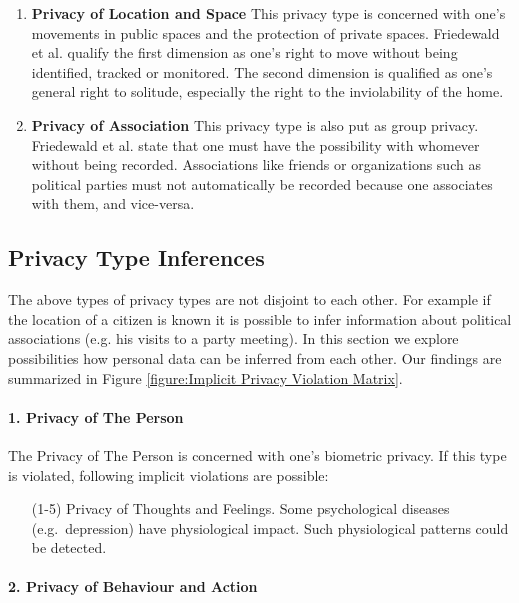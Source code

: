 \begin{enumerate}
\item \textbf{Privacy of Location and Space}
This privacy type is concerned with one's movements in public spaces and the protection of private spaces.
Friedewald et al. qualify the first dimension as one's right to move without being identified, tracked or monitored.
The second dimension is qualified as one's general right to solitude, especially the right to the inviolability of the home.


\item \textbf{Privacy of Association}
This privacy type is also put as group privacy.
Friedewald et al. state that one must have the possibility with whomever without being recorded.
Associations like friends or organizations such as political parties must not automatically be recorded because one associates with them, and vice-versa.
\end{enumerate}

\subsection{Privacy Type Inferences}

The above types of privacy types are not disjoint to each other.
For example if the location of a citizen is known it is possible to infer information about political associations (e.g. his visits to a party meeting).
In this section we explore possibilities how personal data can be inferred from each other.
Our findings are summarized in Figure \ref{figure:Implicit Privacy Violation Matrix}.



\paragraph*{1. Privacy of The Person}

The Privacy of The Person is concerned with one's biometric privacy.
If this type is violated, following implicit violations are possible:

\begin{itemize}
\item [(1-5)]
  Privacy of Thoughts and Feelings. Some psychological diseases
  (e.g.~depression) have physiological impact. Such physiological
  patterns could be detected.
\end{itemize}

\paragraph*{2. Privacy of Behaviour and Action}

